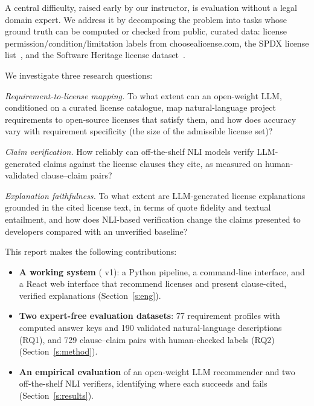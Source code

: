 A central difficulty, raised early by our instructor, is evaluation without a legal domain expert. We address it by decomposing the problem into tasks whose ground truth can be computed or checked from public, curated data: license permission/condition/limitation labels from choosealicense.com, the SPDX license list~\cite{spdx}, and the Software Heritage license dataset~\cite{zacchiroli2022dataset}.

We investigate three research questions:
\begin{description}[leftmargin=1cm, labelwidth=0.8cm, labelsep=0.2cm, font=\normalfont\bfseries]
    \item[RQ1] \textit{Requirement-to-license mapping.} To what extent can an open-weight LLM, conditioned on a curated license catalogue, map natural-language project requirements to open-source licenses that satisfy them, and how does accuracy vary with requirement specificity (the size of the admissible license set)?
    \item[RQ2] \textit{Claim verification.} How reliably can off-the-shelf NLI models verify LLM-generated claims against the license clauses they cite, as measured on human-validated clause--claim pairs?
    \item[RQ3] \textit{Explanation faithfulness.} To what extent are LLM-generated license explanations grounded in the cited license text, in terms of quote fidelity and textual entailment, and how does NLI-based verification change the claims presented to developers compared with an unverified baseline?
\end{description}

\noindent This report makes the following contributions:
\begin{itemize}
    \item \textbf{A working system} (\sys{} v1): a Python pipeline, a command-line interface, and a React web interface that recommend licenses and present clause-cited, verified explanations (Section~\ref{s:eng}).
    \item \textbf{Two expert-free evaluation datasets}: 77 requirement profiles with computed answer keys and 190 validated natural-language descriptions (RQ1), and 729 clause--claim pairs with human-checked labels (RQ2) (Section~\ref{s:method}).
    \item \textbf{An empirical evaluation} of an open-weight LLM recommender and two off-the-shelf NLI verifiers, identifying where each succeeds and fails (Section~\ref{s:results}).
\end{itemize}
